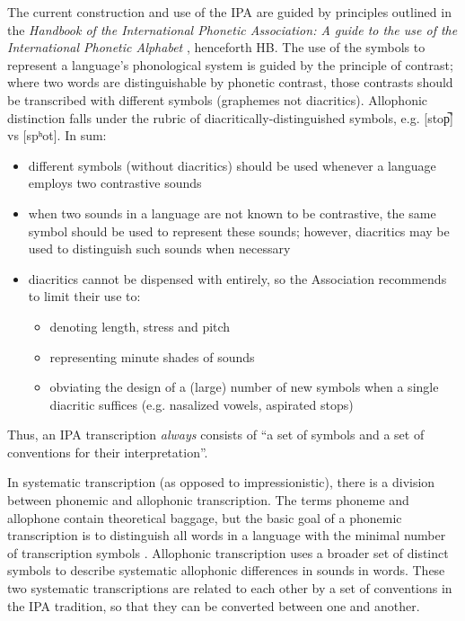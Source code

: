 The current construction and use of the IPA are guided by principles outlined 
in the \textit{Handbook of the International Phonetic Association: A guide 
to the use of the International Phonetic Alphabet} \citep[159]{IPA1999}, henceforth 
HB. The use of the symbols to represent a language's phonological system is guided 
by the principle of contrast; where two words are distinguishable by phonetic contrast, 
those contrasts should be transcribed with different symbols (graphemes not diacritics). 
Allophonic distinction falls under the rubric of diacritically-distinguished symbols, 
e.g. [stop̚] vs [spʰot]. In sum:

\begin{itemize}
	\item different symbols (without diacritics) should be used whenever a language employs two contrastive sounds
	\item when two sounds in a language are not known to be contrastive, the same symbol should be used to represent these sounds; however, diacritics may be used to distinguish such sounds when necessary
	\item diacritics cannot be dispensed with entirely, so the Association recommends to limit their use to:
	\begin{itemize}
		\item denoting length, stress and pitch
		\item representing minute shades of sounds
		\item obviating the design of a (large) number of new symbols when a single diacritic suffices (e.g. nasalized vowels, aspirated stops)
	\end{itemize}
\end{itemize}	

\noindent Thus, an IPA transcription \textit{always} consists of ``a set of 
symbols and a set of conventions for their interpretation''. 

In systematic transcription (as opposed to impressionistic), there is a division 
between phonemic and allophonic transcription. The terms phoneme and allophone 
contain theoretical baggage, but the basic goal of a phonemic transcription is to 
distinguish all words in a language with the minimal number of transcription 
symbols \citep[19]{Abercrombie1964}. Allophonic transcription uses a broader 
set of distinct symbols to describe systematic allophonic differences in sounds 
in words. These two systematic transcriptions are related to each other by a 
set of conventions in the IPA tradition, so that they can be converted between 
one and another.

